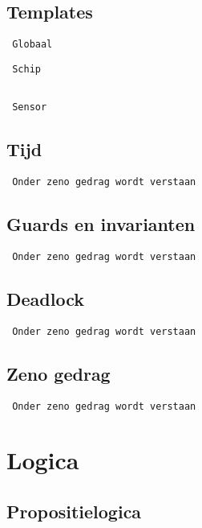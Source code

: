\documentclass{article}
\begin{document}
\subsection{Templates}
\begin{verbatim}
 Globaal
\end{verbatim}

\begin{verbatim}
 Schip
 
\end{verbatim}


	

\begin{verbatim}
 Sensor
\end{verbatim}



\subsection{Tijd}
\begin{verbatim}
 Onder zeno gedrag wordt verstaan
\end{verbatim}

\subsection{Guards en invarianten}
\begin{verbatim}
 Onder zeno gedrag wordt verstaan
\end{verbatim}

\subsection{Deadlock}
\begin{verbatim}
 Onder zeno gedrag wordt verstaan
\end{verbatim}

\subsection{Zeno gedrag}
\begin{verbatim}
 Onder zeno gedrag wordt verstaan
\end{verbatim}


\section{Logica}

\subsection{Propositielogica}
\end{document}
